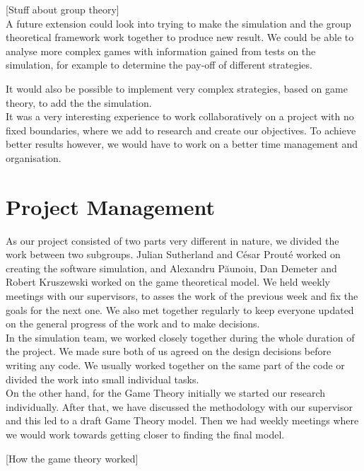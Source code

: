 \documentclass[10pt, a4paper]{report}
\begin{document}
[Stuff about group theory] \\

A future extension could look into trying to make the simulation and the group theoretical framework work together to produce new result. We could be able to analyse more complex games with information gained from tests on the simulation, for example to determine the pay-off of different strategies.

It would also be possible to implement very complex strategies, based on game theory, to add the the simulation. \\

It was a very interesting experience to work collaboratively on a project with no fixed boundaries, where we add to research and create our objectives. To achieve better results however, we would have to work on a better time management and organisation.


\chapter{Project Management}\label{ch:projmanag}

As our project consisted of two parts very different in nature, we divided the work between two subgroups. Julian Sutherland and C\'{e}sar Prout\'{e} worked on creating the software simulation, and Alexandru P\u{a}unoiu, Dan Demeter and Robert Kruszewski worked on the game theoretical model. We held weekly meetings with our supervisors, to asses the work of the previous week and fix the goals for the next one. We also met together regularly to keep everyone updated on the general progress of the work and to make decisions. \\

In the simulation team, we worked closely together during the whole duration of the project. We made sure both of us agreed on the design decisions before writing any code. We usually worked together on the same part of the code or divided the work into small individual tasks. \\

On the other hand, for the Game Theory initially we started our research individually. After that, we have discussed the methodology with our supervisor and this led to a draft Game Theory model. Then we had weekly meetings where we would work towards getting closer to finding the final model. 


[How the game theory worked] \\
\end{document}

